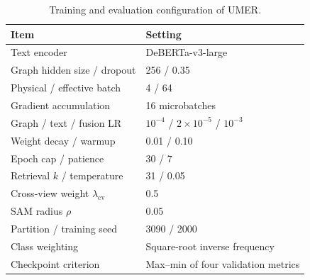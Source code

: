 \documentclass[sigconf,anonymous,review]{../acmart/acmart}
\newcommand{\method}{\textsc{UMER}}
\begin{document}
\begin{table}[b]
  \caption{Training and evaluation configuration of \method.}
  \label{tab:training-config}
  \centering
  \small
  \setlength{\tabcolsep}{4pt}
  \begin{tabular}{@{}ll@{}}
    \toprule
    Item & Setting \\
    \midrule
    Text encoder & DeBERTa-v3-large \\
    Graph hidden size / dropout & 256 / 0.35 \\
    Physical / effective batch & 4 / 64 \\
    Gradient accumulation & 16 microbatches \\
    Graph / text / fusion LR & $10^{-4}$ / $2{\times}10^{-5}$ / $10^{-3}$ \\
    Weight decay / warmup & 0.01 / 0.10 \\
    Epoch cap / patience & 30 / 7 \\
    Retrieval $k$ / temperature & 31 / 0.05 \\
    Cross-view weight $\lambda_{\mathrm{cv}}$ & 0.5 \\
    SAM radius $\rho$ & 0.05 \\
    Partition / training seed & 3090 / 2000 \\
    Class weighting & Square-root inverse frequency \\
    Checkpoint criterion & Max--min of four validation metrics \\
    \bottomrule
  \end{tabular}
\end{table}
\end{document}
